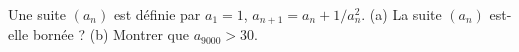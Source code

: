 Une suite $(a_n)$ est définie par $a_1 = 1$, $a_{n+1} = a_n + 1/a_n^2$. (a) La suite $(a_n)$ est-elle bornée ? (b) Montrer que $a_{9000} > 30$.
